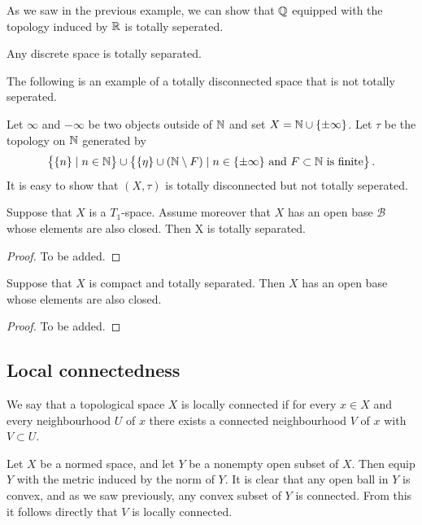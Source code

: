 \documentclass[11pt,a4paper]{article}
\begin{document}
\begin{example}
  As we saw in the previous example, we can show that $\mathbb{Q}$ equipped with the
  topology induced by $\mathbb{R}$ is totally seperated.
\end{example}
\begin{example}
  Any discrete space is totally separated.
\end{example}

The following is an example of a totally disconnected space that is not
totally seperated.

\begin{example}
  Let $\infty$ and $-\infty$ be two objects outside of $\mathbb{N}$ and set
  $X = \mathbb{N} \cup\{\pm \infty\}$. Let $\tau$ be the topology on $\mathbb{N}$
  generated by
  \[
    \left\{\{n\} \mid n \in \mathbb{N}\right\} \cup 
    \left\{\{\eta\} \cup (\mathbb{N} \setminus F) \mid
    n \in \{\pm \infty\} \text{ and $F \subset \mathbb{N}$ is finite}\right\}.
  \]
  It is easy to show that $(X, \tau)$ is totally disconnected but not
  totally seperated. 
\end{example}

\begin{proposition}
  Suppose that $X$ is a $T_1$-space.
  Assume moreover that $X$ has an open base $\mathcal B$ whose elements 
  are also closed. Then X is totally separated.
\end{proposition}
\begin{proof}
  To be added.
\end{proof}

\begin{proposition}
  Suppose that $X$ is compact and totally separated.
  Then $X$ has an open base whose elements are also closed.
\end{proposition}
\begin{proof}
  To be added.
\end{proof}

\subsection{Local connectedness}

\begin{definition}
  We say that a topological space $X$ is locally connected if for every
  $x \in X$ and every neighbourhood $U$ of $x$ there exists a connected
  neighbourhood $V$ of $x$ with $V \subset U$.
\end{definition}

\begin{example}
  Let $X$ be a normed space, and let $Y$ be a nonempty open subset of
  $X$. Then equip $Y$ with the metric induced by the norm of $Y$.
  It is clear that any open ball in $Y$ is convex, and as we saw
  previously, any convex subset of $Y$ is connected.
  From this it follows directly that $V$ is locally connected.
\end{example}
\end{document}
